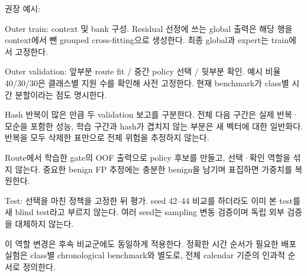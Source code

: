 권장 예시:

\par\noindent \textbullet\enspace Outer train: context 및 bank 구성. Residual 선정에 쓰는 global 출력은 해당 행을 context에서 뺀 grouped cross-fitting으로 생성한다. 최종 global과 expert는 train에서 고정한다.


\par\noindent \textbullet\enspace Outer validation: 앞부분 route fit /\allowbreak{} 중간 policy 선택 /\allowbreak{} 뒷부분 확인. 예시 비율 40/\allowbreak{}30/\allowbreak{}30은 클래스별 지원 수를 확인해 사전 고정한다. 현재 benchmark가 class별 시간 분할이라는 점도 명시한다.


\par\noindent \textbullet\enspace Hash 반복이 많은 만큼 두 validation 보고를 구분한다. 전체 다음 구간은 실제 반복·모순을 포함한 성능, 학습 구간과 hash가 겹치지 않는 부분은 새 벡터에 대한 일반화다. 반복을 모두 삭제한 표만으로 전체 위험을 추정하지 않는다.


\par\noindent \textbullet\enspace Route에서 학습한 gate의 OOF 출력으로 policy 후보를 만들고, 선택·확인 역할을 섞지 않는다. 중요한 benign FP 추정에는 충분한 benign을 남기며 표집하면 가중치를 복원한다.


\par\noindent \textbullet\enspace Test: 선택을 마친 정책을 고정한 뒤 평가. seed 42–44 비교를 하더라도 이미 본 test를 새 blind test라고 부르지 않는다. 여러 seed는 sampling 변동 검증이며 독립 외부 검증을 대체하지 않는다.


이 역할 변경은 후속 비교군에도 동일하게 적용한다. 정확한 시간 순서가 필요한 배포 실험은 class별 chronological benchmark와 별도로, 전체 calendar 기준의 인과적 순서로 정의한다.

